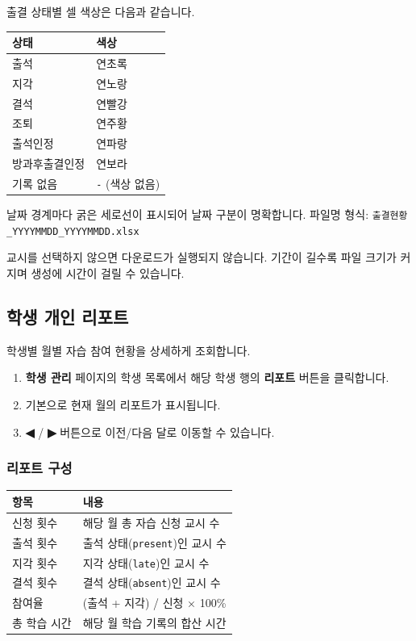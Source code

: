 \documentclass[a4paper,12pt]{article}
\newcommand{\menu}[1]{\textcolor{primary}{\textbf{#1}}}
\begin{document}
출결 상태별 셀 색상은 다음과 같습니다.

\begin{center}
\begin{tabular}{ll}
\toprule
\textbf{상태} & \textbf{색상} \\
\midrule
출석 & 연초록 \\
지각 & 연노랑 \\
결석 & 연빨강 \\
조퇴 & 연주황 \\
출석인정 & 연파랑 \\
방과후출결인정 & 연보라 \\
기록 없음 & \texttt{-} (색상 없음) \\
\bottomrule
\end{tabular}
\end{center}

날짜 경계마다 굵은 세로선이 표시되어 날짜 구분이 명확합니다.
파일명 형식: \texttt{출결현황\_YYYYMMDD\_YYYYMMDD.xlsx}

\begin{notebox}
  교시를 선택하지 않으면 다운로드가 실행되지 않습니다.
  기간이 길수록 파일 크기가 커지며 생성에 시간이 걸릴 수 있습니다.
\end{notebox}

\subsection{학생 개인 리포트}

학생별 월별 자습 참여 현황을 상세하게 조회합니다.

\begin{enumerate}[leftmargin=1.5em]
    \item \menu{학생 관리} 페이지의 학생 목록에서 해당 학생 행의 \menu{리포트} 버튼을 클릭합니다.
    \item 기본으로 현재 월의 리포트가 표시됩니다.
    \item \menu{◀} / \menu{▶} 버튼으로 이전/다음 달로 이동할 수 있습니다.
\end{enumerate}

\subsubsection{리포트 구성}

\begin{center}
\begin{tabularx}{\textwidth}{lX}
\toprule
\textbf{항목} & \textbf{내용} \\
\midrule
신청 횟수 & 해당 월 총 자습 신청 교시 수 \\
출석 횟수 & 출석 상태(\texttt{present})인 교시 수 \\
지각 횟수 & 지각 상태(\texttt{late})인 교시 수 \\
결석 횟수 & 결석 상태(\texttt{absent})인 교시 수 \\
참여율 & (출석 + 지각) / 신청 × 100\% \\
총 학습 시간 & 해당 월 학습 기록의 합산 시간 \\
\bottomrule
\end{tabularx}
\end{center}
\end{document}
